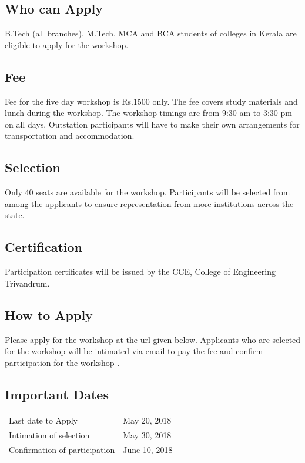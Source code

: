 \documentclass[notumble,10pt,a4paper]{leaflet}
\begin{document}
\subsection{\large{Who can Apply}}
B.Tech (all branches), M.Tech, MCA and BCA students of colleges in Kerala are eligible to apply for the workshop. 

\subsection{\large{Fee}}
Fee for the five day workshop is Rs.1500 only. The fee covers study materials and lunch during the workshop. The workshop timings are from 9:30 am to 3:30 pm on all days. Outstation participants will have to make their own arrangements for transportation and accommodation. 

\newpage
\subsection{\large{Selection}}
Only 40 seats are available for the workshop. Participants will be selected from among the applicants to ensure representation from more institutions across the state. 

\subsection{\large{Certification}}
Participation certificates will be issued by the CCE, College of Engineering Trivandrum.

\subsection{\large{How to Apply}}
Please apply for the workshop at the url given below. Applicants who are selected for the workshop will be intimated via email to pay the fee and confirm participation for the workshop \cite{cit:latex-man}.

\subsection{\large{Important Dates}}
\noindent
\begin{tabular}{@{}ll}
	Last date to Apply & May 20, 2018\\
	Intimation of selection      & May 30, 2018\\
	Confirmation of participation & June 10, 2018
\end{tabular}
\end{document}
